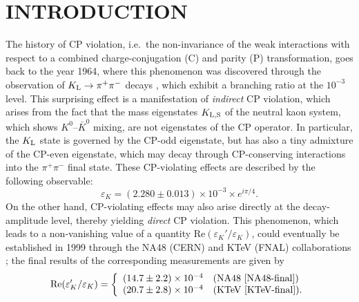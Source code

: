 \documentclass[11pt]{cernrep}
\begin{document}
\section{INTRODUCTION}\label{sec:intro}
\setcounter{equation}{0}
%
%
%
The history of CP violation, i.e.\ the non-invariance of the weak interactions
with respect to a combined charge-conjugation (C) and parity (P) 
transformation, goes back to the year 1964, where this phenomenon was
discovered through the observation of $K_{\rm L}\to\pi^+\pi^-$ decays
\cite{CP-obs}, which exhibit a branching ratio at the $10^{-3}$ level. This 
surprising effect is a manifestation of {\it indirect} CP violation, which arises 
from the fact that the mass eigenstates $K_{\rm L,S}$ of the neutral kaon 
system, which shows $K^0$--$\bar K^0$ mixing, are not eigenstates of the 
CP operator. In particular, the $K_{\rm L}$ state is governed by the CP-odd 
eigenstate, but has also a tiny admixture of the CP-even eigenstate, which 
may decay through CP-conserving interactions into the $\pi^+\pi^-$ final state. 
These CP-violating effects are described by the following observable:
\begin{equation}\label{epsK}
\varepsilon_K=(2.280\pm0.013)\times10^{-3}\times e^{i\pi/4}.
\end{equation}
On the other hand, CP-violating effects may also arise directly at the decay-amplitude
level, thereby yielding {\it direct} CP violation. This phenomenon, which leads to a
non-vanishing value of a quantity Re$(\varepsilon_K'/\varepsilon_K)$, could 
eventually be established in 1999 through the NA48 (CERN) and KTeV 
(FNAL) collaborations \cite{eps-prime}; the final results of the corresponding 
measurements are given by
\begin{equation}\label{epsp-eps-final}
\mbox{Re}(\varepsilon_K'/\varepsilon_K)=\left\{\begin{array}{ll}
(14.7\pm2.2)\times10^{-4}&\mbox{(NA48 \cite{NA48-final})}\\
(20.7\pm2.8)\times10^{-4}&\mbox{(KTeV \cite{KTeV-final}).}
\end{array}
\right.
\end{equation}
\end{document}
